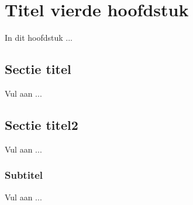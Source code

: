 \chapter{Titel vierde hoofdstuk}

In dit hoofdstuk ...

\section{Sectie titel}

Vul aan ...

\section{Sectie titel2}

Vul aan ...

\subsection{Subtitel}
Vul aan ...